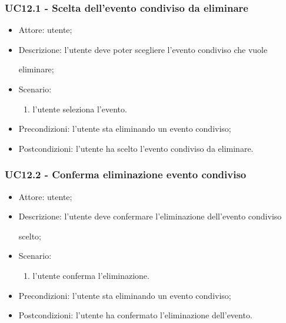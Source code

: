 \subsubsection{UC12.1 - Scelta dell'evento condiviso da eliminare} \label{sec: UC12.1}
\begin{itemize}
    \item Attore: utente;
    \item Descrizione: l'utente deve poter scegliere l'evento condiviso che vuole \par eliminare;
    \item Scenario:
        \begin{enumerate}
        \item l'utente seleziona l'evento.
        \end{enumerate}
    
    \item Precondizioni: l'utente sta eliminando un evento condiviso;
    \item Postcondizioni: l'utente ha scelto l'evento condiviso da eliminare.
\end{itemize}


\subsubsection{UC12.2 - Conferma eliminazione evento condiviso} \label{sec: UC12.2}
\begin{itemize}
    \item Attore: utente;
    \item Descrizione: l'utente deve confermare l'eliminazione dell'evento condiviso \par scelto;
    \item Scenario:
        \begin{enumerate}
        \item l'utente conferma l'eliminazione.
        \end{enumerate}
    
    \item Precondizioni: l'utente sta eliminando un evento condiviso;
    \item Postcondizioni: l'utente ha confermato l'eliminazione dell'evento.
\end{itemize}



